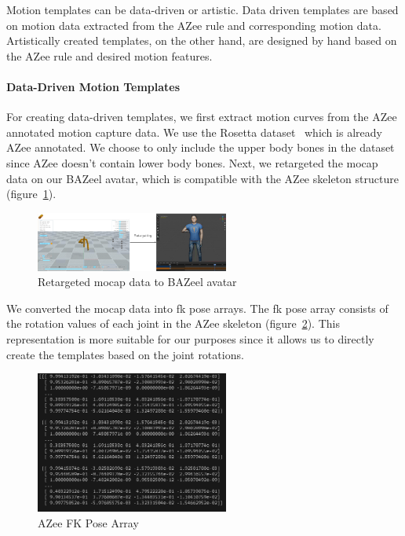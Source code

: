 \documentclass[../../main.tex]{subfiles}
\begin{document}
Motion templates can be data-driven or artistic. Data driven templates are based on motion data extracted from the AZee rule and corresponding motion data. Artistically created templates, on the other hand, are designed by hand based on the AZee rule and desired motion features.

\paragraph{Data-Driven Motion Templates}
\label{ch:intermediate_blocks_pose_correction:creating_motion_templates:data_driven}

For creating data-driven templates, we first extract motion curves from the AZee annotated motion capture data. We use the Rosetta dataset~\cite{bertin2022rosetta} which is already AZee annotated. We choose to only include the upper body bones in the dataset since AZee doesn't contain lower body bones. Next, we retargeted the \gls{mocap} data on our BAZeel avatar, which is compatible with the AZee skeleton structure (figure~\ref{fig:retargeted}).

\begin{figure}
  \centering \includegraphics[width = 2.5in]{chapters/intermediate_blocks_pose_correction/images/retargeted.png}
  \caption{Retargeted mocap data to BAZeel avatar}
  \label{fig:retargeted}
\end{figure}

We converted the \gls{mocap} data into \gls{fk} pose arrays. The \gls{fk} pose array consists of the rotation values of each joint in the AZee skeleton (figure~\ref{fig:azee_fk_pose}). This representation is more suitable for our purposes since it allows us to directly create the templates based on the joint rotations.

\begin{figure}
  \centering \includegraphics[width = 2.5in]{chapters/intermediate_blocks_pose_correction/images/azee_fk_pose.png}
  \caption{AZee FK Pose Array}
  \label{fig:azee_fk_pose}
\end{figure}
\end{document}
